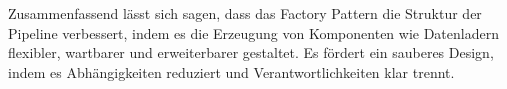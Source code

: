 \documentclass[a4paper]{article} %
\begin{document}
Zusammenfassend lässt sich sagen, dass das Factory Pattern die Struktur der Pipeline verbessert, indem es die Erzeugung von Komponenten wie Datenladern flexibler, wartbarer und erweiterbarer gestaltet. Es fördert ein sauberes Design, indem es Abhängigkeiten reduziert und Verantwortlichkeiten klar trennt.
\end{document}

